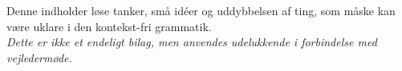 Denne indholder løse tanker, små idéer og uddybbelsen af ting, som måske kan være uklare i den kontekst-fri grammatik.\\

\noindent \textit{Dette er ikke et endeligt bilag, men anvendes udelukkende i forbindelse med vejledermøde.}

